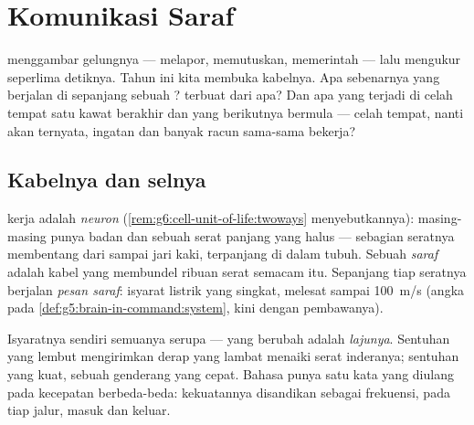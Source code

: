 \chapter{Komunikasi Saraf}\label{ch:g8:nervous-communication}

 menggambar gelungnya ---
melapor, memutuskan, memerintah --- lalu mengukur seperlima
detiknya. Tahun ini kita membuka kabelnya. Apa sebenarnya
yang berjalan di sepanjang sebuah ?  terbuat dari
apa? Dan apa yang terjadi di celah tempat satu kawat
berakhir dan yang berikutnya bermula --- celah tempat,
nanti akan ternyata, ingatan dan banyak racun sama-sama
bekerja?

\section{Kabelnya dan selnya}

\begin{definition}\label{def:g8:nervous-communication:neuron}
 kerja  adalah \emph{neuron}
(\cref{rem:g6:cell-unit-of-life:twoways} menyebutkannya):
masing-masing punya badan  dan sebuah serat panjang yang
halus --- sebagian seratnya membentang dari 
sampai jari kaki,  terpanjang di dalam tubuh. Sebuah
\emph{saraf} adalah kabel yang membundel ribuan
serat semacam itu. Sepanjang tiap seratnya berjalan
\emph{pesan saraf}: isyarat listrik yang
singkat, melesat sampai \qty{100}{m/s} (angka pada
\cref{def:g5:brain-in-command:system}, kini dengan
pembawanya).
\end{definition}

\begin{proposition}\label{prop:g8:nervous-communication:code}
Isyaratnya sendiri semuanya serupa --- yang berubah adalah
\emph{lajunya}. Sentuhan yang lembut mengirimkan derap yang
lambat menaiki serat inderanya; sentuhan yang kuat, sebuah
genderang yang cepat. Bahasa  punya satu kata
yang diulang pada kecepatan berbeda-beda: kekuatannya
disandikan sebagai frekuensi, pada tiap jalur, masuk dan keluar.
\end{proposition}
\admitted

